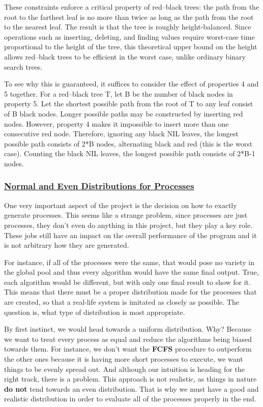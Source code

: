 \documentclass{article}
\begin{document}
These constraints enforce a critical property of red–black trees: the path from the root to the farthest leaf is no more than twice as long as the path from the root to the nearest leaf. The result is that the tree is roughly height-balanced. Since operations such as inserting, deleting, and finding values require worst-case time proportional to the height of the tree, this theoretical upper bound on the height allows red–black trees to be efficient in the worst case, unlike ordinary binary search trees.

To see why this is guaranteed, it suffices to consider the effect of properties 4 and 5 together. For a red–black tree T, let B be the number of black nodes in property 5. Let the shortest possible path from the root of T to any leaf consist of B black nodes. Longer possible paths may be constructed by inserting red nodes. However, property 4 makes it impossible to insert more than one consecutive red node. Therefore, ignoring any black NIL leaves, the longest possible path consists of 2*B nodes, alternating black and red (this is the worst case). Counting the black NIL leaves, the longest possible path consists of 2*B-1 nodes.

\subsubsection{\underline{Normal and Even Distributions for Processes}}

One very important aspect of the project is the decision on how to exactly generate processes. This seems like a strange problem, since processes are just processes, they don't even do anything in this project, but they play a key role. These jobs still have an impact on the overall performance of the program and it is not arbitrary how they are generated.

For instance, if all of the processes were the same, that would pose no variety in the global pool and thus every algorithm would have the same final output. True, each algorithm would be different, but with only one final result to show for it. This means that there must be a proper distribution made for the processes that are created, so that a real-life system is imitated as closely as possible. The question is, what type of distribution is most appropriate.

By first instinct, we would head towards a uniform distribution. Why? Because we want to treat every process as equal and reduce the algorithms being biased towards them. For instance, we don't want the \textbf{FCFS} procedure to outperform the other ones because it is having more short processes to execute, we want things to be evenly spread out. And although our intuition is heading for the right track, there is a problem. This approach is not realistic, as things in nature \textbf{do not} tend towards an even distribution. That is why we must have a good and realistic distribution in order to evaluate all of the processes properly in the end.
\end{document}

